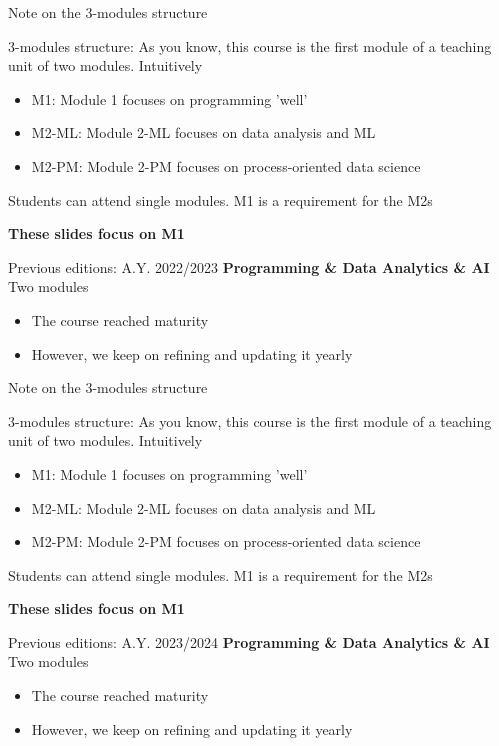 \documentclass{beamer}%
\begin{document}
\begin{frame}{Note on the 3-modules structure}
	\begin{block}{3-modules structure: %
		}
		As you know, this course is the first module of a teaching unit of two modules. Intuitively
		\begin{itemize}
			\item M1: Module 1 focuses on programming 'well'
			\item M2-ML: Module 2-ML focuses  on data analysis and ML
			\item M2-PM: Module 2-PM focuses on process-oriented data science
		\end{itemize}
		Students can attend single modules. M1 is a requirement for the M2s
		\vspace{-0.4cm}
		\begin{center}\textbf{These slides focus on M1}\end{center}
	\end{block}	
	\begin{block}{Previous editions: A.Y. 2022/2023}
		\textbf{Programming \& Data Analytics \& AI}\\ Two modules
		\begin{itemize}
			\item The course reached maturity
			\item However, we keep on refining and updating it yearly
		\end{itemize}
	\end{block}
\end{frame}

\begin{frame}{Note on the 3-modules structure}
	\begin{block}{3-modules structure: %
		}
		As you know, this course is the first module of a teaching unit of two modules. Intuitively
		\begin{itemize}
			\item M1: Module 1 focuses on programming 'well'
			\item M2-ML: Module 2-ML focuses  on data analysis and ML
			\item M2-PM: Module 2-PM focuses on process-oriented data science
		\end{itemize}
		Students can attend single modules. M1 is a requirement for the M2s
		\vspace{-0.4cm}
		\begin{center}\textbf{These slides focus on M1}\end{center}
	\end{block}	
	\begin{block}{Previous editions: A.Y. 2023/2024}
		\textbf{Programming \& Data Analytics \& AI}\\ Two modules
		\begin{itemize}
			\item The course reached maturity
			\item However, we keep on refining and updating it yearly
		\end{itemize}
	\end{block}
\end{frame}
\end{document}
